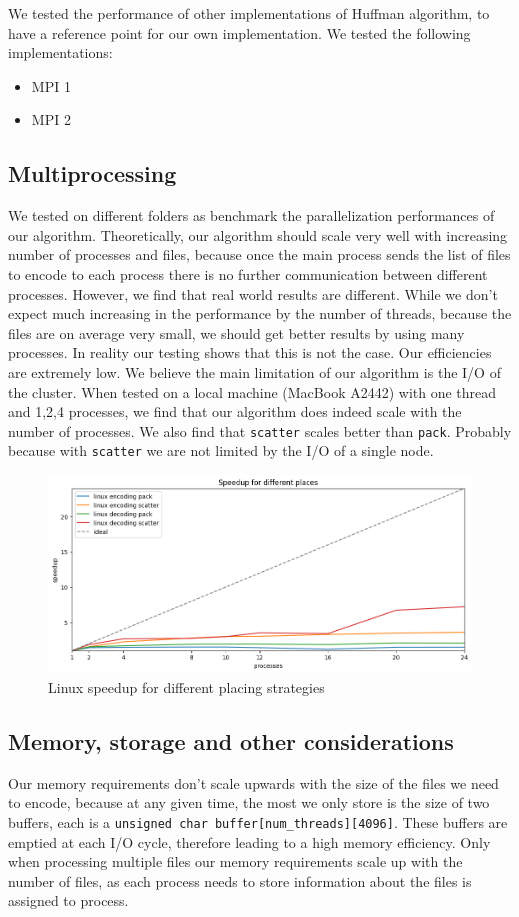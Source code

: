 We tested the performance of other implementations of Huffman algorithm, to have a reference point for our own implementation. We tested the following implementations:
\begin{itemize}
	\item MPI 1
	\item MPI 2
\end{itemize}

\subsection{Multiprocessing}
We tested on different folders as benchmark the parallelization performances of our algorithm. Theoretically, our algorithm should scale very well with increasing number of processes and files, because once the main process sends the list of files to encode to each process there is no further communication between different processes. However, we find that real world results are different. 
While we don't expect much increasing in the performance by the number of threads, because the files are on average very small, we should get better results by using many processes.
In reality our testing shows that this is not the case. Our efficiencies are extremely low. We believe the main limitation of our algorithm is the I/O of the cluster. When tested on a local machine (MacBook A2442) with one thread and 1,2,4 processes, we find that our algorithm does indeed scale with the number of processes.
We also find that \verb|scatter| scales better than \verb|pack|. Probably because with \verb|scatter| we are not limited by the I/O of a single node.
\begin{figure}
	\centering
	\includegraphics[width=1\linewidth]{"../imgs/linux speedup"}
	\caption{Linux speedup for different placing strategies}
	\label{fig:linux-scatter-pack}
\end{figure}
\subsection{Memory, storage and other considerations}
Our memory requirements don't scale upwards with the size of the files we need to encode, because at any given time, the most we only store is the size of two buffers, each is a \verb|unsigned char buffer[num_threads][4096]|. These buffers are emptied at each I/O cycle, therefore leading to a high memory efficiency. Only when processing multiple files our memory requirements scale up with the number of files, as each process needs to store information about the files is assigned to process.

